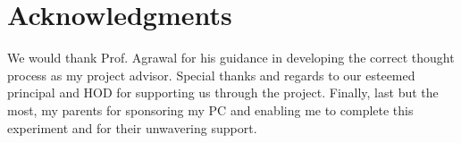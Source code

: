 


\thispagestyle{empty}
\pagestyle{empty}



\chapter*{Acknowledgments}
\vspace{0.2in}
\hspace{0.9cm} We would thank Prof. Agrawal for his
guidance in developing the correct thought process as my
project advisor. Special thanks and regards to our esteemed principal and HOD for supporting us through the project. Finally, last but the most, my parents
for sponsoring my PC and enabling me to complete this
experiment and for their unwavering support.


